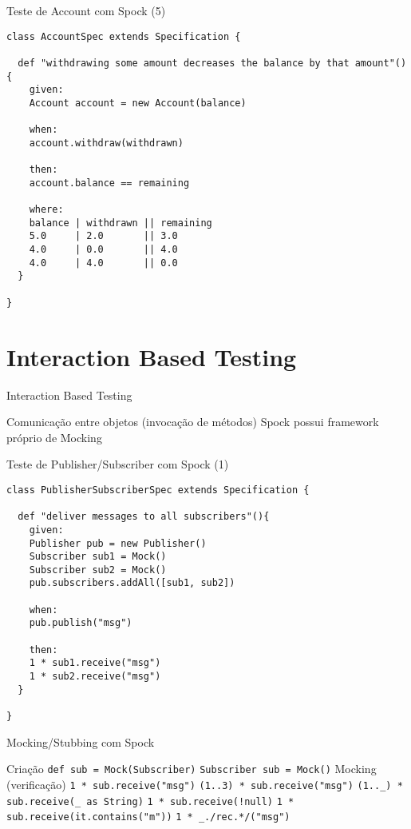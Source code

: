 \documentclass{beamer}
\begin{document}
\begin{frame}[fragile]{Teste de Account com Spock (5)}
 \begin{verbatim}
class AccountSpec extends Specification {
  
  def "withdrawing some amount decreases the balance by that amount"(){
    given:
    Account account = new Account(balance)
    
    when:
    account.withdraw(withdrawn)
    
    then:
    account.balance == remaining
    
    where:
    balance | withdrawn || remaining
    5.0     | 2.0       || 3.0
    4.0     | 0.0       || 4.0
    4.0     | 4.0       || 0.0
  }
  
}
  \end{verbatim}
\end{frame}

\section{Interaction Based Testing}

\begin{frame}{Interaction Based Testing}
 \begin{outline}
    Comunicação entre objetos (invocação de métodos)
    Spock possui framework próprio de Mocking
 \end{outline}
\end{frame}

\begin{frame}[fragile]{Teste de Publisher/Subscriber com Spock (1)}
 \begin{verbatim}
class PublisherSubscriberSpec extends Specification {

  def "deliver messages to all subscribers"(){
    given:
    Publisher pub = new Publisher()
    Subscriber sub1 = Mock()
    Subscriber sub2 = Mock()
    pub.subscribers.addAll([sub1, sub2])
    
    when:
    pub.publish("msg")
    
    then:
    1 * sub1.receive("msg")
    1 * sub2.receive("msg")
  }
  
}
  \end{verbatim}
\end{frame}

\begin{frame}{Mocking/Stubbing com Spock}
 \begin{outline}
    Criação
    \2 \texttt{def sub = Mock(Subscriber)}
    \2 \texttt{Subscriber sub = Mock()}
    Mocking (verificação)
     \texttt{1 * sub.receive("msg")}
     \texttt{(1..3) * sub.receive("msg")}
     \texttt{(1.._) * sub.receive(_ as String)}
     \texttt{1 * sub.receive(!null)}
     \texttt{1 * sub.receive({it.contains("m")})}
     \texttt{1 * _./rec.*/("msg")}
 \end{outline}
\end{frame}
\end{document}
